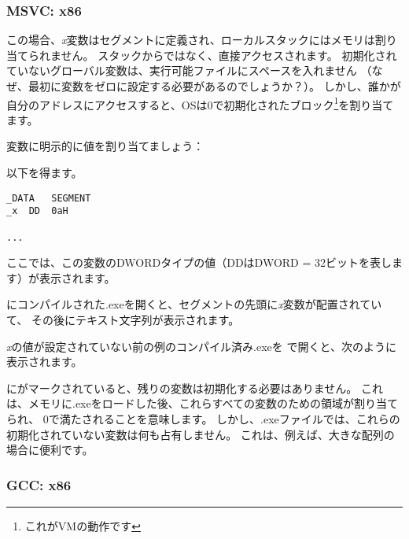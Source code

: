 \subsubsection{MSVC: x86}



この場合、\emph{x}変数はセグメントに定義され、ローカルスタックにはメモリは割り当てられません。 スタックからではなく、直接アクセスされます。 
初期化されていないグローバル変数は、実行可能ファイルにスペースを入れません
（なぜ、最初に変数をゼロに設定する必要があるのでしょうか？）。
しかし、誰かが自分のアドレスにアクセスすると、\ac{OS}は0で初期化されたブロック\footnote{これが\ac{VM}の動作です}を割り当てます。

変数に明示的に値を割り当てましょう：



以下を得ます。

\begin{lstlisting}[style=customasmx86]
_DATA	SEGMENT
_x	DD	0aH

...
\end{lstlisting}

ここでは、この変数のDWORDタイプの値（DDはDWORD = 32ビットを表します）が表示されます。

\IDA にコンパイルされた.exeを開くと、セグメントの先頭に\emph{x}変数が配置されていて、
その後にテキスト文字列が表示されます。

\emph{x}の値が設定されていない前の例のコンパイル済み.exeを \IDA で開くと、次のように表示されます。



\label{BSSClearedByCStd}
にがマークされていると、残りの変数は初期化する必要はありません。 
これは、メモリに.exeをロードした後、これらすべての変数のための領域が割り当てられ、
0で満たされることを意味します。 
しかし、.exeファイルでは、これらの初期化されていない変数は何も占有しません。 
これは、例えば、大きな配列の場合に便利です。



\subsubsection{GCC: x86}

